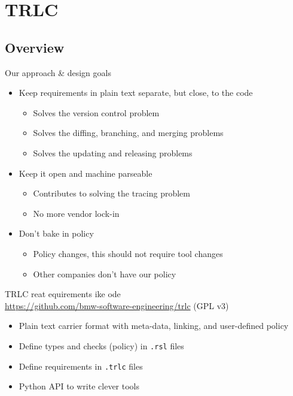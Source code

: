 \documentclass[aspectratio=169]{beamer}
\begin{document}
\section{TRLC}
\subsection{Overview}
\begin{frame}{Our approach \& design goals}
  \begin{itemize}
  \item Keep requirements in plain text separate, but close, to the code
    \begin{itemize}
    \item Solves the version control problem
    \item Solves the diffing, branching, and merging problems
    \item Solves the updating and releasing problems
    \end{itemize}
    \pause

  \item Keep it open and machine parseable
    \begin{itemize}
    \item Contributes to solving the tracing problem
    \item No more vendor lock-in
    \end{itemize}
    \pause

  \item Don't bake in policy
    \begin{itemize}
    \item Policy changes, this should not require tool changes
    \item Other companies don't have our policy
    \end{itemize}
  \end{itemize}
\end{frame}

\begin{frame}{TRLC}
  reat equirements ike ode\\
  \url{https://github.com/bmw-software-engineering/trlc} (GPL v3)
  \begin{itemize}
  \item Plain text carrier format with meta-data, linking, and
    user-defined policy
  \item Define types and checks (policy) in \texttt{.rsl} files
  \item Define requirements in \texttt{.trlc} files
  \item Python API to write clever tools
  \end{itemize}
\end{frame}
\end{document}
